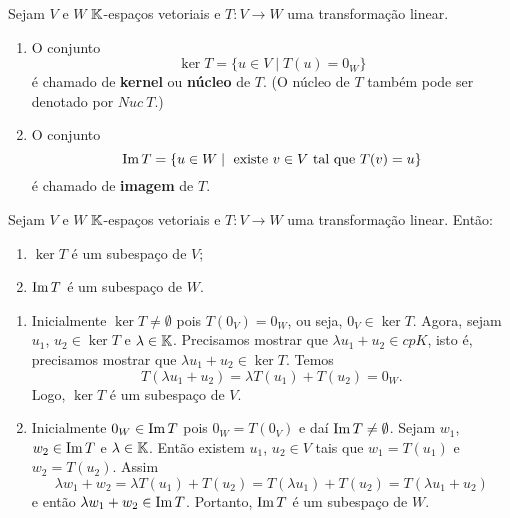 \begin{definicao}
	Sejam $V$ e $W$ $\mathbb{K}$-espaços vetoriais e $T : V \to W$ uma transformação linear.
	\begin{enumerate}
		\item O conjunto
		\[
			\ker T = \{u \in V \mid T(u) = 0_W\}
		\]
		é chamado de \textbf{kernel} ou \textbf{núcleo} de $T$. (O núcleo de $T$ também pode ser denotado por $Nuc\ T$.)

		\item O conjunto
		\[
			{\rm Im\,} T = \{u \in W \mid \mbox{ existe } v \in V \mbox{ tal que } T(v) = u\}
		\]
		é chamado de \textbf{imagem} de $T$.
	\end{enumerate}
\end{definicao}

\begin{proposicao}
	Sejam $V$ e $W$ $\mathbb{K}$-espaços vetoriais e $T : V \to W$ uma transformação linear. Então:
	\begin{enumerate}
		\item $\ker T$ é um subespaço de $V$;
		\item ${\rm Im\,} T$ é um subespaço de $W$.
	\end{enumerate}
\end{proposicao}
\begin{prova}
	\begin{enumerate}
		\item Inicialmente $\ker T \ne \emptyset$ pois $T(0_V) = 0_W$, ou seja, $0_V \in \ker T$. Agora, sejam $u_1$, $u_2 \in \ker T$ e $\lambda \in \mathbb{K}$. Precisamos mostrar que $\lambda u_1 + u_2 \in cp{K}$, isto é, precisamos mostrar que $\lambda u_1 + u_2 \in \ker T$. Temos
		\[
			T(\lambda u_1 + u_2) = \lambda T(u_1) + T(u_2) = 0_W.
		\]
		Logo, $\ker T$ é um subespaço de $V$.

		\item Inicialmente $0_W \in {\rm Im\,} T$ pois $0_W = T(0_V)$ e daí ${\rm Im\,} T \ne \emptyset$. Sejam $w_1$, $w_2 \in {\rm Im\,} T$ e $\lambda \in \mathbb{K}$. Então existem $u_1$, $u_2 \in V$ tais que $w_1 = T(u_1)$ e $w_2 = T(u_2)$. Assim
		\[
			\lambda w_1 + w_2 = \lambda T(u_1) + T(u_2) = T(\lambda u_1) + T(u_2) = T(\lambda u_1 + u_2)
		\]
		e então $\lambda w_1 + w_2 \in {\rm Im\,} T$. Portanto, ${\rm Im\,} T$ é um subespaço de $W$.
	\end{enumerate}
\end{prova}